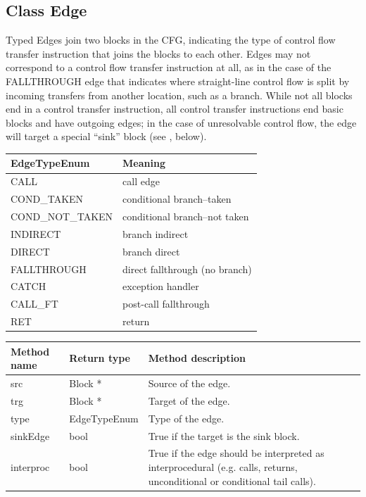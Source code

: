 \subsection{Class Edge}


Typed Edges join two blocks in the CFG, indicating the type of control flow
transfer instruction that joins the blocks to each other. Edges may not correspond
to a control flow transfer instruction at all, as in the case of the FALLTHROUGH
edge that indicates where straight-line control flow is split by
incoming transfers from another location, such as a branch. While not all
blocks end in a control transfer instruction, all control transfer instructions
end basic blocks and have outgoing edges; in the case of unresolvable control
flow, the edge will target a special ``sink'' block (see ,
below).

\begin{center}
\begin{tabular}{ll}
\toprule
EdgeTypeEnum & Meaning \\
\midrule
CALL & call edge \\
COND\_TAKEN & conditional branch--taken \\
COND\_NOT\_TAKEN & conditional branch--not taken \\
INDIRECT & branch indirect \\
DIRECT & branch direct \\
FALLTHROUGH & direct fallthrough (no branch) \\
CATCH & exception handler \\
CALL\_FT & post-call fallthrough \\
RET & return \\
\bottomrule
\end{tabular}
\end{center}

\begin{tabularx}{\textwidth}{llX}
\toprule
Method name & Return type & Method description \\
\midrule
src & Block * & Source of the edge. \\
trg & Block * & Target of the edge. \\
type & EdgeTypeEnum & Type of the edge. \\
sinkEdge & bool & True if the target is the sink block. \\
interproc & bool & True if the edge should be interpreted as interprocedural
(e.g. calls, returns, unconditional or conditional tail calls). \\
\bottomrule
\end{tabularx}
